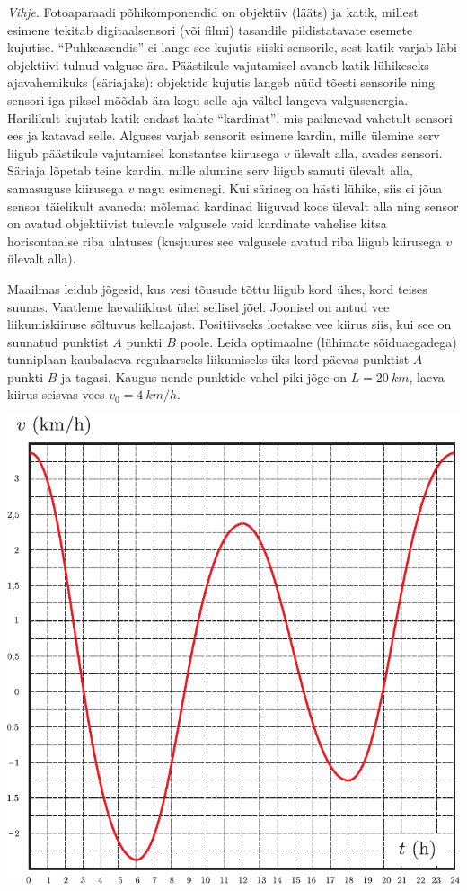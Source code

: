 \documentclass[10pt, twoside]{article}
\begin{document}
{\emph{Vihje}. 
Fotoaparaadi põhikomponendid on objektiiv (lääts) ja katik, millest
esimene tekitab digitaalsensori (või filmi) tasandile pildistatavate esemete kujutise. \enquote{Puhkeasendis} ei lange see kujutis siiski sensorile, sest katik varjab
läbi objektiivi tulnud valguse ära. Päästikule vajutamisel avaneb katik lühikeseks ajavahemikuks (säriajaks): objektide kujutis langeb nüüd tõesti sensorile
ning sensori iga piksel mõõdab ära kogu selle aja vältel langeva valgusenergia.
Harilikult kujutab katik endast kahte \enquote{kardinat}, mis paiknevad vahetult sensori ees ja katavad selle. Alguses varjab sensorit esimene kardin, mille ülemine
serv liigub päästikule vajutamisel konstantse kiirusega $v$ ülevalt alla, avades
sensori. Säriaja lõpetab teine kardin, mille alumine serv liigub samuti ülevalt
alla, samasuguse kiirusega $v$ nagu esimenegi. Kui säriaeg on hästi lühike, siis
ei jõua sensor täielikult avaneda: mõlemad kardinad liiguvad koos ülevalt alla
ning sensor on avatud objektiivist tulevale valgusele vaid kardinate vahelise
kitsa horisontaalse riba ulatuses (kusjuures see valgusele avatud riba liigub
kiirusega $v$ ülevalt alla).
\probend
\bigskip


Maailmas leidub jõgesid, kus vesi tõusude tõttu liigub kord ühes, kord teises suunas. Vaatleme laevaliiklust ühel sellisel jõel. Joonisel on antud vee liikumiskiiruse sõltuvus kellaajast. Positiivseks loetakse vee kiirus siis, kui see on suunatud punktist $A$ punkti $B$ poole. Leida optimaalne (lühimate sõiduaegadega) tunniplaan kaubalaeva regulaarseks liikumiseks üks kord päevas punktist $A$ punkti $B$ ja tagasi. Kaugus nende punktide vahel piki jõge on $L = \SI{20}{km}$, laeva kiirus seisvas vees $v_0 = \SI{4}{km/h}$.

\begin{center}
	\includegraphics[width=0.7\linewidth]{2007-v3g-05-yl}
\end{center}
\probend
\bigskip

}
\end{document}
